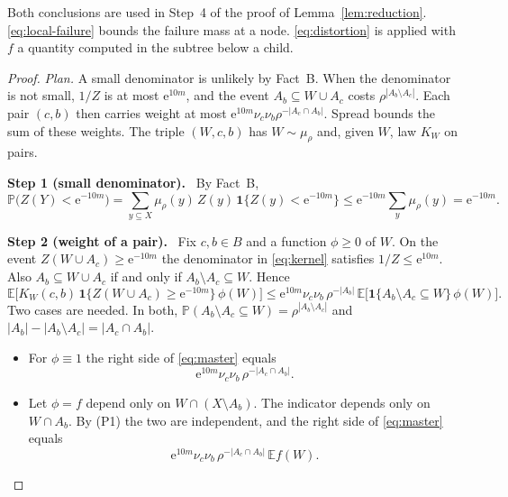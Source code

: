 \documentclass[11pt]{article}
\numberwithin{equation}{section}
\newcommand{\PP}{\mathbb P}
\newcommand{\EE}{\mathbb E}
\newcommand{\ind}{\mathbf 1}
\newcommand{\ee}{\mathrm e}
\newcommand{\step}[2]{\medskip\noindent\textbf{Step #1 (#2).}\ }
\begin{document}
Both conclusions are used in Step~4 of the proof of
Lemma~\ref{lem:reduction}. \eqref{eq:local-failure} bounds the failure
mass at a node. \eqref{eq:distortion} is applied with $f$ a quantity
computed in the subtree below a child.

\begin{proof}
\emph{Plan.} A small denominator is unlikely by Fact~B. When the
denominator is not small, $1/Z$ is at most $\ee^{10m}$, and the event
$A_b\subseteq W\cup A_c$ costs $\rho^{|A_b\setminus A_c|}$. Each pair
$(c,b)$ then carries weight at most
$\ee^{10m}\nu_c\nu_b\rho^{-|A_c\cap A_b|}$. Spread bounds the sum of
these weights. The triple $(W,c,b)$ has $W\sim\mu_\rho$ and, given
$W$, law $K_W$ on pairs.

\step{1}{small denominator}
By Fact~B,
\begin{equation}\label{eq:small-denominator}
 \PP\bigl(Z(Y)<\ee^{-10m}\bigr)
 =\sum_{y\subseteq X}\mu_\rho(y)\,Z(y)\,\ind\{Z(y)<\ee^{-10m}\}
 \le\ee^{-10m}\sum_{y}\mu_\rho(y)=\ee^{-10m}.
\end{equation}

\step{2}{weight of a pair}
Fix $c,b\in B$ and a function $\phi\ge0$ of $W$. On the event
$Z(W\cup A_c)\ge\ee^{-10m}$ the denominator in \eqref{eq:kernel}
satisfies $1/Z\le\ee^{10m}$. Also $A_b\subseteq W\cup A_c$ if and only
if $A_b\setminus A_c\subseteq W$. Hence
\begin{equation}\label{eq:master}
 \EE\bigl[K_W(c,b)\,\ind\{Z(W\cup A_c)\ge\ee^{-10m}\}\,\phi(W)\bigr]
 \le\ee^{10m}\nu_c\nu_b\,\rho^{-|A_b|}\,
 \EE\bigl[\ind\{A_b\setminus A_c\subseteq W\}\,\phi(W)\bigr].
\end{equation}
Two cases are needed. In both,
$\PP(A_b\setminus A_c\subseteq W)=\rho^{|A_b\setminus A_c|}$ and
$|A_b|-|A_b\setminus A_c|=|A_c\cap A_b|$.
\begin{itemize}[leftmargin=1.6em,itemsep=2pt]
 \item For $\phi\equiv1$ the right side of \eqref{eq:master} equals
 \begin{equation}\label{eq:master-one}
  \ee^{10m}\nu_c\nu_b\,\rho^{-|A_c\cap A_b|}.
 \end{equation}
 \item Let $\phi=f$ depend only on $W\cap(X\setminus A_b)$. The
 indicator depends only on $W\cap A_b$. By (P1) the two are
 independent, and the right side of \eqref{eq:master} equals
 \begin{equation}\label{eq:master-f}
  \ee^{10m}\nu_c\nu_b\,\rho^{-|A_c\cap A_b|}\,\EE f(W).
 \end{equation}
\end{itemize}


\end{proof}
\end{document}
